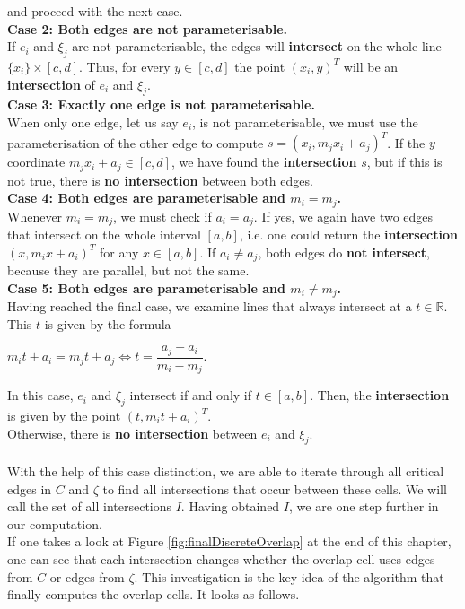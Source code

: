 \documentclass[a4paper,12pt,leqno]{article}
\theoremstyle{plain}
\theoremstyle{remark}
\newcommand{\R}{\mathbb{R}}
\begin{document}
and proceed with the next case. \\
\textbf{Case 2: Both edges are not parameterisable.}\\
If $e_i$ and $\xi_j$ are not parameterisable, the edges will \textbf{intersect} on the whole line $\{x_i\} \times [c, d]$. Thus, for every $y \in [c, d]$ the point $(x_i, y)^T$ will be an \textbf{intersection} of $e_i$ and $\xi_j$. \\
\textbf{Case 3: Exactly one edge is not parameterisable.}\\
When only one edge, let us say $e_i$, is not parameterisable, we must use the parameterisation of the other edge to compute $s = (x_i, m_j x_i + a_j)^T$. If the $y$ coordinate $m_j x_i + a_j \in [c, d]$, we have found the \textbf{intersection} $s$, but if this is not true, there is \textbf{no intersection} between both edges. \\
\textbf{Case 4: Both edges are parameterisable and $m_i = m_j$.} \label{case:4}\\
Whenever $m_i = m_j$, we must check if $a_i = a_j$. If yes, we again have two edges that intersect on the whole interval $[a, b]$, i.e. one could return the \textbf{intersection} $ (x, m_i x + a_i)^T$ for any $x \in [a, b]$. If $a_i \neq a_j$, both edges do \textbf{not intersect}, because they are parallel, but not the same. \\
\textbf{Case 5: Both edges are parameterisable and $m_i \neq m_j$.}\\
Having reached the final case, we examine lines that always intersect at a $t \in \R$. This $t$ is given by the formula
 \begin{center}
 	$m_i t + a_i = m_j t + a_j \iff t = \dfrac{a_j - a_i}{m_i - m_j}$. 
 \end{center}
 In this case, $e_i$ and $\xi_j$ intersect if and only if $t \in [a, b]$. Then, the \textbf{intersection} is given by the point $(t, m_i t + a_i )^T$. \\
 Otherwise, there is \textbf{no intersection} between $e_i$ and $\xi_j$. \\
\smallskip \\
With the help of this case distinction, we are able to iterate through all critical edges in $C$ and $\zeta$ to find all intersections that occur between these cells. We will call the set of all intersections $I$. Having obtained $I$, we are one step further in our computation. \\ 
If one takes a look at Figure \ref{fig:finalDiscreteOverlap} at the end of this chapter, one can see that each intersection changes whether the overlap cell uses edges from $C$ or edges from $\zeta$. This investigation is the key idea of the algorithm that finally computes the overlap cells. It looks as follows. \\
\end{document}
